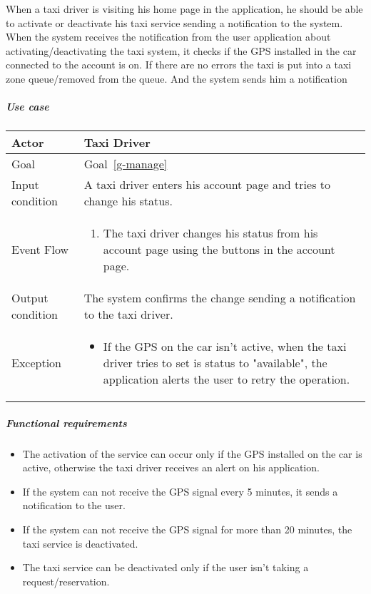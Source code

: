 When a taxi driver is visiting his home page in the application, he should be able to activate or deactivate his taxi service sending a notification to the system.
When the system receives the notification from the user application about activating/deactivating the taxi system, it checks if the GPS installed in the car connected to the account is on. If there are no errors the taxi is put into a taxi zone queue/removed from the queue. And the system sends him a notification

\subparagraph{Use case}
\noindent
    \begin{center}
        \begin{longtable}{| l | p{} |}
            \hline
            Actor & Taxi Driver \\
            \hline
            Goal & Goal~\ref{g-manage}
            \\
            \hline
            Input condition & A taxi driver enters his account page and tries to change his status. \\
            \hline
            Event Flow & 
                \begin{enumerate}
                	\item The taxi driver changes his status from his account page using the buttons in the account page.
            	\end{enumerate}
            \\
            \hline
            Output condition & The system confirms the change sending a notification to the taxi driver.\\
            \hline
            Exception & 
            \begin{itemize}
               \item If the GPS on the car isn't active, when the taxi driver tries to set is status to "available", the application alerts the user to retry the operation.
            \end{itemize} \\
            \hline
        \end{longtable}
    \end{center}

\subparagraph{Functional requirements}
\noindent
	\begin{itemize}
		\item The activation of the service can occur only if the GPS installed on the car is active, otherwise the taxi driver receives an alert on his application.
		\item If the system can not receive the GPS signal every 5 minutes, it sends a notification to the user.
		\item If the system can not receive the GPS signal for more than 20 minutes, the taxi service is deactivated.
		\item The taxi service can be deactivated only if the user isn't taking a request/reservation.
	\end{itemize} 
